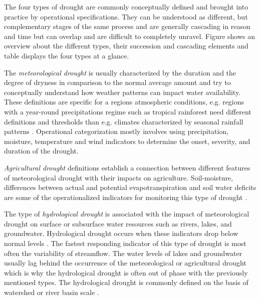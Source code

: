 The four types of drought are commonly conceptually defined and brought into practice by operational specifications. They can be understood as different, but complementary stages of the same process and are generally cascading in reason and time but can overlap and are difficult to completely unravel. Figure  shows an overview about the different types, their succession and cascading elements and table  displays the four types at a glance.


The \textit{meteorological drought} is usually characterized by the duration and the degree of dryness in comparison to the normal average amount and try to conceptually understand how weather patterns can impact water availability. These definitions are specific for a regions atmospheric conditions, e.g. regions with a year-round precipitations regime such as tropical rainforest need different definitions and thresholds than e.g. climates characterized by seasonal rainfall patterns \autocite{nationaldroughtmitigationcenterTypesDrought}. Operational categorization mostly involves using precipitation, moisture, temperature and wind indicators to determine the onset, severity, and duration of the drought.

\textit{Agricultural drought} definitions establish a connection between different features of meteorological drought with their impacts on agriculture. Soil-moisture, differences between actual and potential evapotranspiration and soil water deficits are some of the operationalized indicators for monitoring this type of drought \autocite{baltiReviewDroughtMonitoring2020,nationaldroughtmitigationcenterTypesDrought,wilhiteUnderstandingDroughtPhenomenon1985}.

The type of \textit{hydrological drought} is associated with the impact of meteorological drought on surface or subsurface water resources such as rivers, lakes, and groundwater. Hydrological drought occurs when these indicators drop below normal levels \autocite{palmerMeteorologicalDrought1965}. The fastest responding indicator of this type of drought is most often the variability of streamflow. The water levels of lakes and groundwater usually lag behind the occurrence of the meteorological or agricultural drought which is why the hydrological drought is often out of phase with the previously mentioned types. The hydrological drought is commonly defined on the basis of watershed or river basin scale \autocite{baltiReviewDroughtMonitoring2020,nationaldroughtmitigationcenterTypesDrought,wilhiteUnderstandingDroughtPhenomenon1985}.

